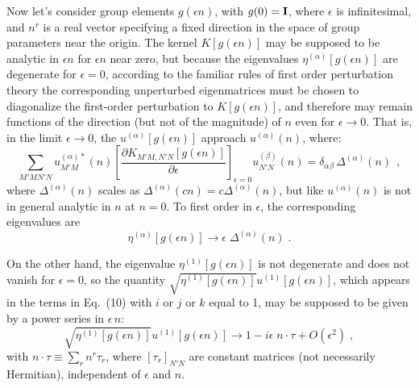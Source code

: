 \documentclass[12pt]{article}
\begin{document}
Now let's consider  group elements $g(\epsilon n)$, with  $g(0)={\bf I}$, where $\epsilon$ is infinitesimal, and $n^r$ is a real vector specifying a fixed direction in the space of group parameters near the origin. 
  The kernel $K[g(\epsilon n)]$ may be supposed to be analytic in $\epsilon n$ for $\epsilon n$ near zero, but because the eigenvalues $\eta^{(\alpha)}[g(\epsilon n)]$ are degenerate for $\epsilon=0$, according to the familiar rules of first order perturbation theory the corresponding unperturbed eigenmatrices  must be chosen to diagonalize the first-order perturbation to $K[g(\epsilon n)]$, and  therefore may remain functions of the direction (but not of the magnitude) of $n$ even  for $\epsilon\rightarrow 0$.  That is, in the limit $\epsilon\rightarrow 0$, the   $u^{(\alpha)}[g(\epsilon n)]$ approach $u^{(\alpha)}(n)$, where:
\begin{equation}
\sum_{M'M N'N} u^{(\alpha)*}_{M'M}(n)\left[\frac{\partial K_{M'M ,N'N}[g(\epsilon n)]}{\partial \epsilon}\right]_{\epsilon=0}u^{(\beta)}_{N'N}(n)=\delta_{\alpha\beta}\,\Delta^{(\alpha)}(n)\,\;,
\end{equation}
where $\Delta^{(\alpha)}(n)$   scales as $\Delta^{(\alpha)}(c n)=c\Delta^{(\alpha)}(n)$, but like $u^{(\alpha)}(n)$ is not in general analytic in $n$ at $n=0$.  To first order in $\epsilon$, the corresponding eigenvalues are
\begin{equation}
\eta^{(\alpha)}[g(\epsilon n)]\rightarrow \epsilon\; \Delta^{(\alpha)}(n)\;.
\end{equation}


On the other hand, the eigenvalue $\eta^{(1)}[g(\epsilon n)]$ is not degenerate and does not vanish for $\epsilon=0$, so the quantity $\sqrt{\eta^{(1)}[g(\epsilon n)]}u^{(1)}[g(\epsilon n)]$, which appears in the terms in Eq.~(10) with $i$ or $j$ or $k$ equal to 1, may be supposed to be given by a power series in $\epsilon\,n$:
\begin{equation}
\sqrt{\eta^{(1)}[g(\epsilon n)]}u^{(1)}[g(\epsilon n)]\rightarrow 1-i\epsilon \;n\cdot \tau+O(\epsilon^2)\;,
\end{equation}
with $n\cdot \tau\equiv \sum_r n^r\tau_r$, where $[\tau_r]_{N'N}$  are constant matrices (not necessarily Hermitian),  independent of $\epsilon$ and $n$.  
\end{document}
